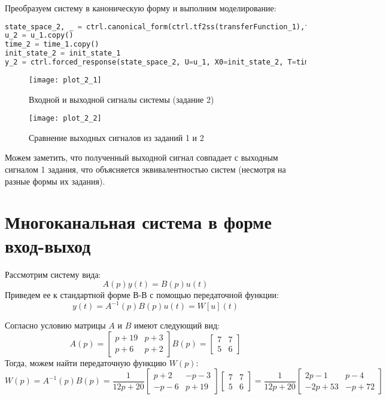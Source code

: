 Преобразуем систему в каноническую форму и выполним моделирование:
\begin{lstlisting}[language=Python]
state_space_2, _ = ctrl.canonical_form(ctrl.tf2ss(transferFunction_1),form="reachable")
u_2 = u_1.copy()
time_2 = time_1.copy()
init_state_2 = init_state_1
y_2 = ctrl.forced_response(state_space_2, U=u_1, X0=init_state_2, T=time_2).outputs
\end{lstlisting}

\begin{figure}[h]
    \centering
    \texttt{[image: plot\_2\_1]}
    \caption{\label{fig:The-caption-1}Входной и выходной сигналы системы (задание 2)}
\end{figure}
\begin{figure}[h]
    \centering
    \texttt{[image: plot\_2\_2]}
    \caption{\label{fig:The-caption-1}Сравнение выходных сигналов из заданий 1 и 2}
\end{figure}

Можем заметить, что полученный выходной сигнал совпадает с выходным сигналом 1 задания,
 что объясняется эквивалентностью систем (несмотря на разные формы их задания).

\pagebreak

\section{Многоканальная система в форме вход-выход}
Рассмотрим систему вида:
\begin{equation}
    A(p)y(t)=B(p)u(t)
\end{equation}
Приведем ее к стандартной форме В-В с помощью передаточной функции:
\begin{equation}
    y(t)=A^{-1}(p)B(p)u(t) = W[u](t)
\end{equation}

Согласно условию матрицы $A$ и $B$ имеют следующий вид:
\begin{equation*}
    A(p)= \begin{bmatrix}
        p+19 & p+3    \\
        p+6 &  p+2
        \end{bmatrix} 
    B(p)= \begin{bmatrix}
        7 & 7    \\
        5 &  6
    \end{bmatrix} 
\end{equation*}
Тогда, можем найти передаточную функцию $W(p)$:
\begin{equation*}
    W(p) = A^{-1}(p)B(p)= \frac{1}{12p + 20} \begin{bmatrix}
        p+2 & -p - 3 \\
        -p -6 & p+19
    \end{bmatrix}
    \begin{bmatrix}
        7 & 7    \\
        5 &  6
    \end{bmatrix} = \frac{1}{12p + 20} \begin{bmatrix}
        2p-1 & p - 4 \\
        -2p + 53 & -p+72
    \end{bmatrix}
\end{equation*}

